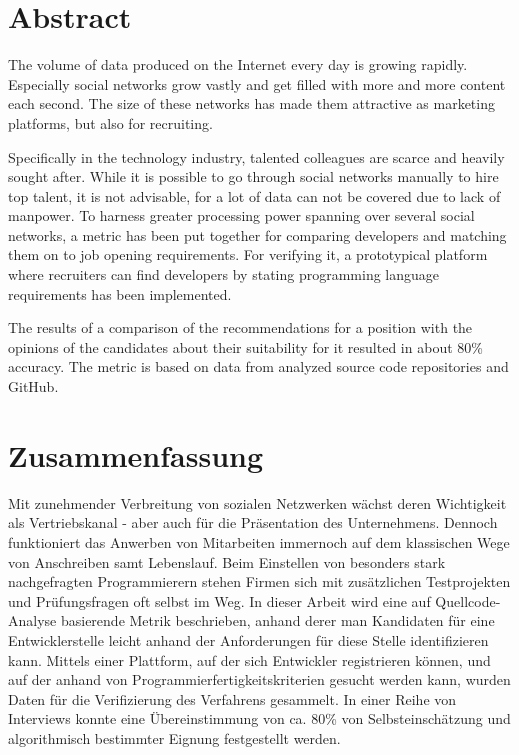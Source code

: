 \begingroup
\let\clearpage\relax
\let\cleardoublepage\relax
\let\cleardoublepage\relax

\chapter*{Abstract}
The volume of data produced on the Internet every day is growing rapidly. Especially social networks grow vastly and get filled with more and more content each second. The size of these networks has made them attractive as marketing platforms, but also for recruiting.

Specifically in the technology industry, talented colleagues are scarce and heavily sought after. While it is possible to go through social networks manually to hire top talent, it is not advisable, for a lot of data can not be covered due to lack of manpower. To harness greater processing power spanning over several social networks, a metric has been put together for comparing developers and matching them on to job opening requirements. For verifying it, a prototypical platform where recruiters can find developers by stating programming language requirements has been implemented.

The results of a comparison of the recommendations for a position with the opinions of the candidates about their suitability for it resulted in about 80\% accuracy. The metric is based on data from analyzed source code repositories and GitHub.


\vfill

\chapter*{Zusammenfassung}
Mit zunehmender Verbreitung von sozialen Netzwerken w\"achst deren Wichtigkeit als Vertriebskanal - aber auch f\"ur die Pr\"asentation des Unternehmens. Dennoch funktioniert das Anwerben von Mitarbeiten immernoch auf dem klassischen Wege von Anschreiben samt Lebenslauf.
Beim Einstellen von besonders stark nachgefragten Programmierern stehen Firmen sich mit zus\"atzlichen Testprojekten und Pr\"ufungsfragen oft selbst im Weg. In dieser Arbeit wird eine auf Quellcode-Analyse basierende Metrik beschrieben, anhand derer man Kandidaten f\"ur eine Entwicklerstelle leicht anhand der Anforderungen f\"ur diese Stelle identifizieren kann. Mittels einer Plattform, auf der sich Entwickler registrieren k\"onnen, und auf der anhand von Programmierfertigkeitskriterien gesucht werden kann, wurden Daten f\"ur die Verifizierung des Verfahrens gesammelt. In einer Reihe von Interviews konnte eine \"Ubereinstimmung von ca. 80\% von Selbsteinsch\"atzung und algorithmisch bestimmter Eignung festgestellt werden.


\endgroup

\vfill